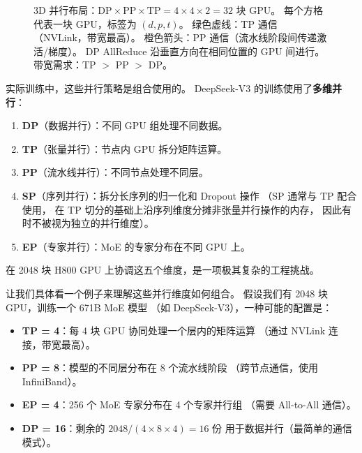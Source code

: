\begin{figure}[htbp]
\caption{3D 并行布局：$\mathrm{DP} \times \mathrm{PP} \times \mathrm{TP} = 4 \times 4 \times 2 = 32$ 块 GPU。
每个方格代表一块 GPU，标签为 $(d, p, t)$。
\textcolor{figGreen}{绿色虚线}：TP 通信（NVLink，带宽最高）。
\textcolor{figOrange}{橙色箭头}：PP 通信（流水线阶段间传递激活/梯度）。
DP AllReduce 沿垂直方向在相同位置的 GPU 间进行。
带宽需求：TP $>$ PP $>$ DP。}
\label{fig:3d-parallelism}
\end{figure}

实际训练中，这些并行策略是组合使用的。
DeepSeek-V3 的训练使用了\textbf{多维并行}：
\begin{enumerate}[noitemsep]
  \item \textbf{DP}（数据并行）：不同 GPU 组处理不同数据。
  \item \textbf{TP}（张量并行）：节点内 GPU 拆分矩阵运算。
  \item \textbf{PP}（流水线并行）：不同节点处理不同层。
  \item \textbf{SP}（序列并行）：拆分长序列的归一化和 Dropout 操作
        （SP 通常与 TP 配合使用，
        在 TP 切分的基础上沿序列维度分摊非张量并行操作的内存，
        因此有时不被视为独立的并行维度）。
  \item \textbf{EP}（专家并行）：MoE 的专家分布在不同 GPU 上。
\end{enumerate}

在 2048 块 H800 GPU 上协调这五个维度，是一项极其复杂的工程挑战。

让我们具体看一个例子来理解这些并行维度如何组合。
假设我们有 2048 块 GPU，训练一个 671B MoE 模型
（如 DeepSeek-V3），一种可能的配置是：
\begin{itemize}[noitemsep]
  \item \textbf{TP = 4}：每 4 块 GPU 协同处理一个层内的矩阵运算
        （通过 NVLink 连接，带宽最高）。
  \item \textbf{PP = 8}：模型的不同层分布在 8 个流水线阶段
        （跨节点通信，使用 InfiniBand）。
  \item \textbf{EP = 4}：256 个 MoE 专家分布在 4 个专家并行组
        （需要 All-to-All 通信）。
  \item \textbf{DP = 16}：剩余的 $2048 / (4 \times 8 \times 4) = 16$ 份
        用于数据并行（最简单的通信模式）。
\end{itemize}

